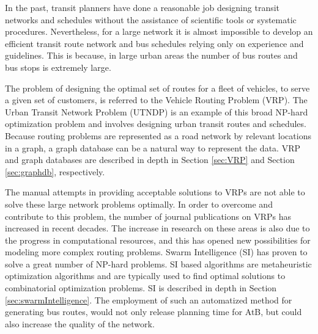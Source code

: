 In the past, transit planners have done a reasonable job designing transit networks and schedules without the assistance of scientific tools or systematic procedures. Nevertheless, for a large network it is almost impossible to develop an efficient transit route network and bus schedules relying only on experience and guidelines. This is because, in large urban areas the number of bus routes and bus stops is extremely large.

The problem of designing the optimal set of routes for a fleet of vehicles, to serve a given set of customers, is referred to the Vehicle Routing Problem (VRP). The Urban Transit Network Problem (UTNDP) is an example of this broad NP-hard optimization problem and involves designing urban transit routes and schedules. Because routing problems are represented as a road network by relevant locations in a graph, a graph database can be a natural way to represent the data. VRP and graph databases are described in depth in Section \vref{sec:VRP} and Section \vref{sec:graphdb}, respectively. 

The manual attempts in providing acceptable solutions to VRPs are not able to solve these large network problems optimally. In order to overcome and contribute to this problem, the number of journal publications on VRPs has increased in recent decades. The increase in research on these areas is also due to the progress in computational resources, and this has opened new possibilities for modeling more complex routing problems. Swarm Intelligence (SI) has proven to solve a great number of NP-hard problems\citep{dorigo97, lucic03}. SI based algorithms are metaheuristic optimization algorithms and are typically used to find optimal solutions to combinatorial optimization problems. SI is described in depth in Section \vref{sec:swarmIntelligence}. The employment of such an automatized method  for generating bus routes, would not only release planning time for AtB, but could also increase the quality of the network.


